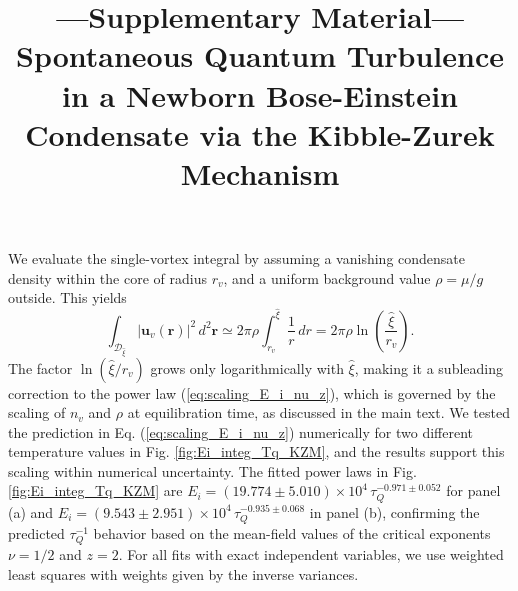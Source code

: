 \documentclass[aps,prl,twocolumn,showpacs,notitlepage,floatfix,superscriptaddress]{revtex4-1}
\makeatletter
\def\maketitle{
\@author@finish
\title@column\titleblock@produce
\suppressfloats[t]}
\makeatother
\begin{document}
We evaluate the single-vortex integral by assuming a vanishing condensate density within the core of radius $r_{v}$, and a uniform background value $\rho=\mu/g$ outside. This yields 
\begin{equation}
    \int_{\mathcal{D}_{\hat{\xi}}}\!\left\vert \boldsymbol{u}_v(\boldsymbol{r})\right\vert^2 \,d^2\boldsymbol{r}
    \simeq
    2 \pi
    \rho 
    \int_{r_{v}}^{\hat{\xi}}\frac{1}{r}\, dr= 
    2 \pi
    \rho
    \ln\left(\frac{\hat{\xi}}{r_v}\right).  
\end{equation}
The factor $\ln(\hat{\xi}/r_v)$ grows only logarithmically with $\hat{\xi}$, making it a subleading correction to the power law (\ref{eq:scaling_E_i_nu_z}), which is governed by the scaling of $n_v$ and $\rho$ at equilibration time, as discussed in the main text. 
We tested the prediction in Eq. (\ref{eq:scaling_E_i_nu_z}) numerically for two different temperature values in Fig. \ref{fig:Ei_integ_Tq_KZM}, and the results support this scaling within numerical uncertainty. The fitted power laws in Fig. \ref{fig:Ei_integ_Tq_KZM} are  $E_i = (19.774 \pm 5.010) \times 10^4 \,\tau_Q^{-0.971 \pm 0.052}$ for panel (a) and $E_i = (9.543 \pm 2.951) \times 10^4 \,\tau_Q^{-0.935 \pm 0.068}$ in panel (b), confirming the predicted $\tau_Q^{-1}$ behavior 
based on the mean-field values of the critical exponents $\nu = 1/2$ and $z = 2$. 
For all fits with exact independent variables, we use weighted least squares with weights given by the inverse variances.

\newpage
\clearpage

\title{---Supplementary Material--- \\Spontaneous Quantum Turbulence in a Newborn Bose-Einstein Condensate via the Kibble-Zurek Mechanism
}
\maketitle
\onecolumngrid
\end{document}
